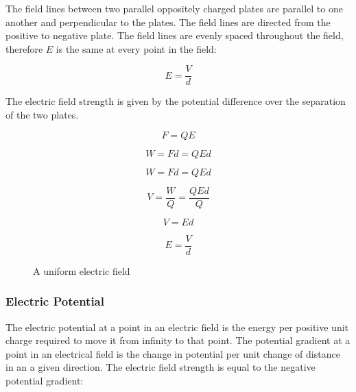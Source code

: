 \documentclass[12pt]{article}
\begin{document}
The field lines between two parallel oppositely charged plates are parallel to one another and perpendicular to the plates. The field lines are directed from the positive to negative plate. The field lines are evenly spaced throughout the field, therefore \(E\) is the same at every point in the field:

\[E = \dfrac{V}{d}\]

The electric field strength is given by the potential difference over the separation of the two plates.

\[F = QE\]

\[W = Fd = QEd\]

\[W = Fd = QEd\]

\[V = \dfrac{W}{Q} = \dfrac{QEd}{Q}\]

\[V = Ed\]

\[E = \frac{V}{d}\]

\begin{figure}[H]
\centering
{}
\caption{A uniform electric field}
\end{figure}

\subsubsection{Electric Potential}
\label{sec:org5f42848}

The electric potential at a point in an electric field is the energy per positive unit charge required to move it from infinity to that point. The potential gradient at a point in an electrical field is the change in potential per unit change of distance in an a given direction. The electric field strength is equal to the negative potential gradient:
\end{document}
